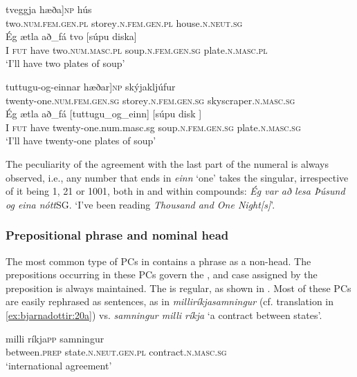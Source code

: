 \documentclass[output=paper]{LSP/langsci}
\begin{document}
\begin{xlist}
\ex
\gll {\ob}tveggja hæða]\textsc{np} hús\\
 two\textsc{.num.fem.gen.pl} storey\textsc{.n.fem.gen.pl} house\textsc{.n.neut.sg}\\

\gll Ég ætla að\_fá tvo  [súpu diska] \\
 I \textsc{fut} have two\textsc{.num.masc.pl} soup\textsc{.n.fem.gen.sg} plate\textsc{.n.masc.pl}\hspace*{-4mm}\\
\glt ‘I’ll have two plates of soup’

\ex
\gll {\ob}tuttugu-og-einnar hæðar]\textsc{np} skýjakljúfur \\
 twenty-one\textsc{.num.fem.gen.sg} storey\textsc{.n.fem.gen.sg}  skyscraper\textsc{.n.masc.sg}\\

\gll Ég ætla að\_fá [tuttugu\_og\_einn]  [súpu disk ]\\
 I \textsc{fut} have twenty-one{.num.masc.sg} soup\textsc{.n.fem.gen.sg} plate\textsc{.n.masc.sg}\\
\glt ‘I’ll have twenty-one plates of soup’
\z
\z

The peculiarity of the agreement with the last part of the numeral is always observed, i.e., any number that ends in \textit{einn} ‘one’ takes the singular, irrespective of it being 1, 21 or 1001, both in  and within compounds: \textit{Ég var að lesa Þúsund og eina nótt}SG.  ‘I’ve been reading \textit{Thousand and One Night[s]}’.

\subsubsection{Prepositional phrase and nominal head}\label{sec:bjarnadottir:3.1.4}

The most common type of PCs in  contains a  phrase as a non-head. The prepositions occurring in these PCs govern the , and case assigned by the preposition is always maintained. The  is regular, as shown in . Most of these PCs are easily rephrased as sentences, as in \textit{milliríkjasamningur} (cf. translation in \ref{ex:bjarnadottir:20a})  vs.  \textit{samningur milli ríkja} ‘a contract between states’.

\ea%
 \label{ex:bjarnadottir:20} 
\ea \label{ex:bjarnadottir:20a} 
\gll {\ob}milli ríkja{\cb}\textsc{pp} samningur\\
 between\textsc{.prep} state\textsc{.n.neut.gen.pl} contract\textsc{.n.masc.sg}\\
\glt ‘international agreement’


\end{xlist}
\end{document}
